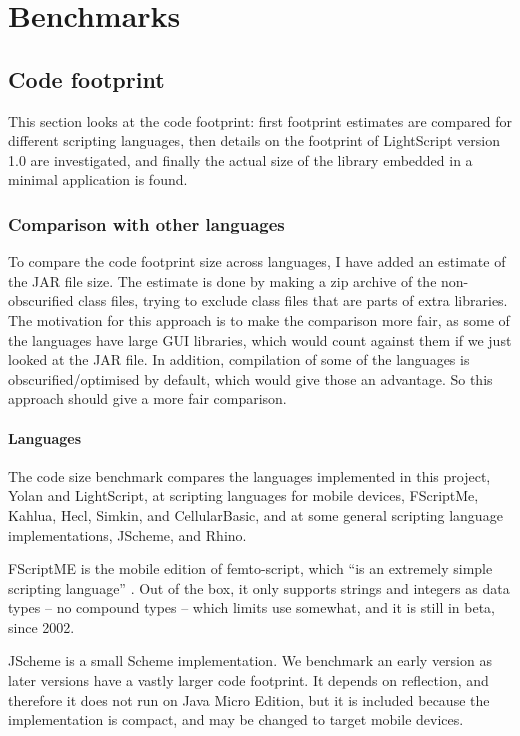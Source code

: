 \documentclass[11pt]{report}
\begin{document}
\chapter{Benchmarks}
\label{benchmark}

\section{Code footprint}
This section looks at the code footprint: first footprint estimates are compared for different scripting languages, then details on the footprint of LightScript version 1.0 are investigated, and finally the actual size of the library embedded in a minimal application is found.

\subsection{Comparison with other languages}
To compare the code footprint size across languages, I have added an estimate of the JAR file size. 
The estimate is done by making a zip archive of the non-obscurified class files,
trying to exclude class files that are parts of extra libraries.
The motivation for this approach is to make the comparison more fair, as some of the languages have large GUI libraries,
which would count against them if we just looked at the JAR file. 
In addition, compilation of some of the languages is obscurified/optimised by default,
which would give those an advantage. So this approach should give a more fair comparison.

\subsubsection{Languages}
\label{codefootprint-languages}
The code size benchmark compares the languages implemented in this project, Yolan and LightScript, at scripting languages for mobile devices, FScriptMe, Kahlua, Hecl, Simkin, and CellularBasic, and at some general scripting language implementations,  JScheme, and Rhino.

FScriptME \cite{fscriptme} is the mobile edition of femto-script, which ``is an extremely simple scripting language'' \cite{fscript}. 
Out of the box, it only supports strings and integers as data types -- no compound types -- which limits use somewhat, and it is still in beta, since 2002. 

JScheme \cite{jscheme} is a small Scheme implementation. We benchmark an early version as later versions have a vastly larger code footprint. It depends on reflection, and therefore it does not run on Java Micro Edition, but it is included because the implementation is compact, and may be changed to target mobile devices.
\end{document}
